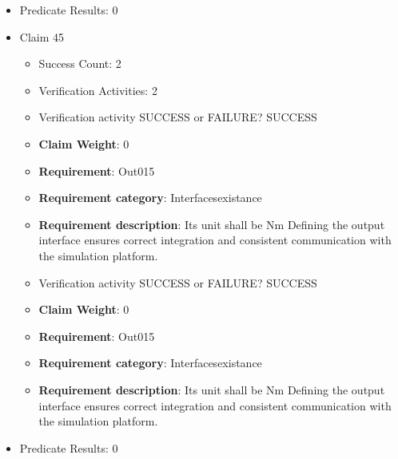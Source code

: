 \documentclass{article}
\begin{document}
\begin{itemize}
\begin{itemize}
					\item Verification activity SUCCESS or FAILURE? SUCCESS
					\item \textbf{Claim Weight}: 0
						\item \textbf{Requirement}: Out014 
						\item \textbf{Requirement category}: Interfacesexistance 
						\item \textbf{Requirement description}: Its unit shall be Degree Defining the output interface ensures correct integration and consistent communication with the simulation platform.
					
				\end{itemize}
				
									    
				\item Predicate Results: 0

  				  \item Claim 45
				\begin{itemize}
			    	\item Success Count: 2 
			    	\item Verification Activities: 2
					\item Verification activity SUCCESS or FAILURE? SUCCESS
					\item \textbf{Claim Weight}: 0
						\item \textbf{Requirement}: Out015 
						\item \textbf{Requirement category}: Interfacesexistance 
						\item \textbf{Requirement description}: Its unit shall be Nm Defining the output interface ensures correct integration and consistent communication with the simulation platform.
					
					\item Verification activity SUCCESS or FAILURE? SUCCESS
					\item \textbf{Claim Weight}: 0
						\item \textbf{Requirement}: Out015 
						\item \textbf{Requirement category}: Interfacesexistance 
						\item \textbf{Requirement description}: Its unit shall be Nm Defining the output interface ensures correct integration and consistent communication with the simulation platform.
					
				\end{itemize}
				
									    
				\item Predicate Results: 0


\end{itemize}
\end{document}
